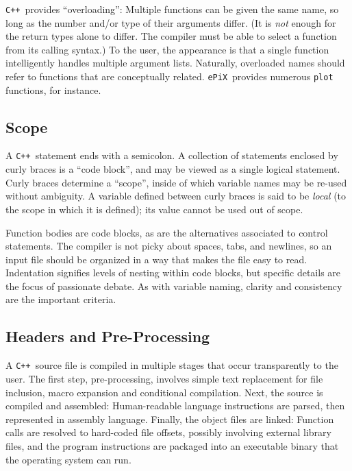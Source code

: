 \documentclass[12pt]{report}
\newcommand{\code}[1]{\texttt{#1}}
\newcommand{\ePiX}{\code{ePiX}}
\newcommand{\CXX}{\code{C++}}
\begin{document}
 \CXX\ provides ``overloading'': Multiple
functions can be given the same name, so long as the number and/or
type of their arguments differ. (It is \emph{not} enough for the
return types alone to differ.  The compiler must be able to select a
function from its calling syntax.)  To the user, the appearance is
that a single function intelligently handles multiple argument
lists. Naturally, overloaded names should refer to functions that are
conceptually related.  \ePiX\ provides numerous \code{plot} functions,
for instance.  


\subsection*{Scope}

A \CXX\ statement ends with a semicolon. A collection of statements
enclosed by curly braces is a ``code block'', and may be viewed as a
single logical statement. Curly braces determine a ``scope'', inside
of which variable names may be re-used without ambiguity. A variable
defined between curly braces is said to be \emph{local} (to the scope
in which it is defined); its value cannot be used out of scope.

Function bodies are code blocks, as are the alternatives associated to
control statements. The compiler is not picky about spaces, tabs, and
newlines, so an input file should be organized in a way that makes the
file easy to read. Indentation signifies levels of nesting within code
blocks, but specific details are the focus of passionate debate. As
with variable naming, clarity and consistency are the important
criteria.


\subsection*{Headers and Pre-Processing}

A \CXX\ source file is compiled in multiple stages that occur
transparently to the user. The first step, pre-processing, involves
simple text replacement for file inclusion, macro expansion and
conditional compilation. Next, the source is compiled and assembled:
Human-readable language instructions are parsed, then represented in
assembly language. Finally, the object files are linked: Function
calls are resolved to hard-coded file offsets, possibly involving
external library files, and the program instructions are packaged into
an executable binary that the operating system can run.
\end{document}
